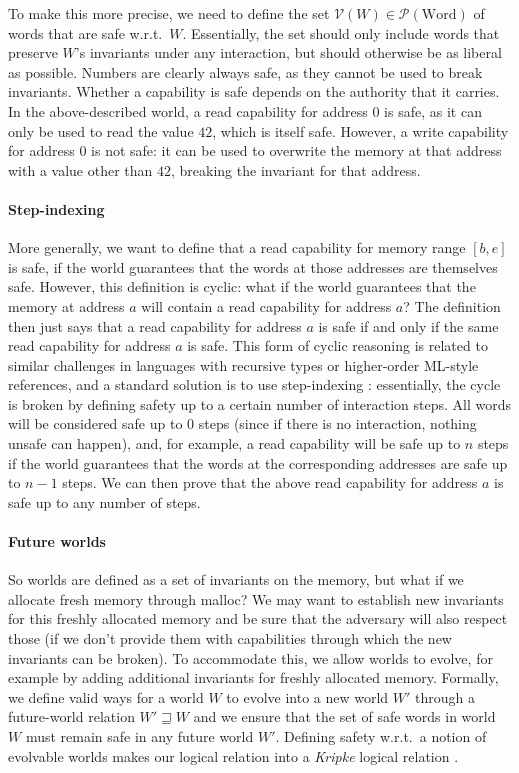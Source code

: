 \documentclass[format=acmsmall, review=false, screen=true]{acmart}
\newcommand{\powerset}[1]{\mathcal{P}(#1)}
\newcommand{\future}{\mathbin{\sqsupseteq}}
\newcommand{\asmType}{\plaindom{AsmType}}
\newcommand{\plaindom}[1]{\mathrm{#1}}
\newcommand{\Words}{\plaindom{Word}}
\newcommand{\intr}[2]{\mathcal{#1}}
\newcommand{\valueintr}[1]{\intr{V}{#1}}
\newcommand{\stdvr}{\valueintr{\asmType}}
\newenvironment{toplas}
    {\color{OliveGreen}
          
    }{}
\begin{document}
\begin{toplas}
To make this more precise, we need to define the set $\stdvr(W) \in
\powerset{\Words}$ of words that are safe w.r.t.\ $W$. Essentially, the set
should only include words that preserve $W$'s invariants under any interaction,
but should otherwise be as liberal as possible. Numbers are clearly always safe,
as they cannot be used to break invariants. Whether a capability is safe depends
on the authority that it carries. In the above-described world, a read capability
for address $0$ is safe, as it can only be used to read the value $42$, which is
itself safe. However, a write capability for address $0$ is not safe: it can be
used to overwrite the memory at that address with a value other than $42$,
breaking the invariant for that address.

\paragraph{Step-indexing}
More generally, we want to define that a read capability for memory range
$[b,e]$ is safe, if the world guarantees that the words at those addresses are
themselves safe. However, this definition is cyclic: what if the world
guarantees that the memory at address $a$ will contain a read capability for
address $a$? The definition then just says that a read capability for address
$a$ is safe if and only if the same read capability for address $a$ is safe. This form of
cyclic reasoning is related to similar challenges in languages with recursive
types or higher-order ML-style references, and a standard solution is
to use step-indexing \citep{Appel:2001:IMR:504709.504712}: essentially, the cycle is broken by defining safety up to a
certain number of interaction steps. All words will be considered
safe up to $0$ steps (since if there is no interaction, nothing unsafe
can happen), and, for example, a read capability will be safe up to $n$
steps if the world guarantees that the words at the corresponding addresses are
safe up to $n - 1$ steps. We can then prove that the above read capability for
address $a$ is safe up to any number of steps.

\paragraph{Future worlds}
So worlds are defined as a set of invariants on the memory, but what if we
allocate fresh memory through malloc? We may want to establish new invariants
for this freshly allocated memory and be sure that the adversary will also
respect those (if we don't provide them with capabilities through which the new
invariants can be broken). To accommodate this, we allow worlds to evolve, for
example by adding additional invariants for freshly allocated memory. Formally,
we define valid ways for a world $W$ to evolve into a new world $W'$ through a
future-world relation $W' \future W$ and we ensure that the set of safe words in
world $W$ must remain safe in any future world $W'$. Defining safety w.r.t.\ a
notion of evolvable worlds makes our logical relation into a \emph{Kripke}
logical relation \citep{pitts_operational_1998}.


\end{toplas}
\end{document}
